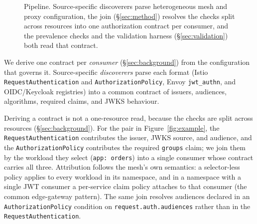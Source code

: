 \begin{figure}[t]
\centering
{}
\caption{Pipeline. Source-specific discoverers parse heterogeneous mesh and proxy
configuration, the join (\S\ref{sec:method}) resolves the checks split across
resources into one authorization contract per consumer, and the prevalence checks
and the validation harness (\S\ref{sec:validation}) both read that contract.}
\label{fig:pipeline}
\end{figure}

We derive one contract per \emph{consumer} (\S\ref{sec:background}) from the
configuration that governs it. Source-specific \emph{discoverers} parse each format
(Istio \texttt{RequestAuthentication} and \texttt{AuthorizationPolicy}, Envoy
\texttt{jwt\_authn}, and OIDC/Keycloak registries) into a common contract of
issuers, audiences, algorithms, required claims, and JWKS behaviour.

Deriving a contract is not a one-resource read, because the checks are split across
resources (\S\ref{sec:background}). For the pair in Figure~\ref{fig:example}, the
\texttt{RequestAuthentication} contributes the issuer, JWKS source, and audience,
and the \texttt{AuthorizationPolicy} contributes the required \texttt{groups} claim;
we join them by the workload they select (\texttt{app: orders}) into a single
consumer whose contract carries all three. Attribution follows the mesh's own
semantics: a selector-less policy applies to every workload in its namespace, and
in a namespace with a single JWT consumer a per-service claim policy attaches to
that consumer (the common edge-gateway pattern). The same join resolves audiences
declared in an \texttt{AuthorizationPolicy} condition on
\texttt{request.auth.audiences} rather than in the \texttt{RequestAuthentication}.

